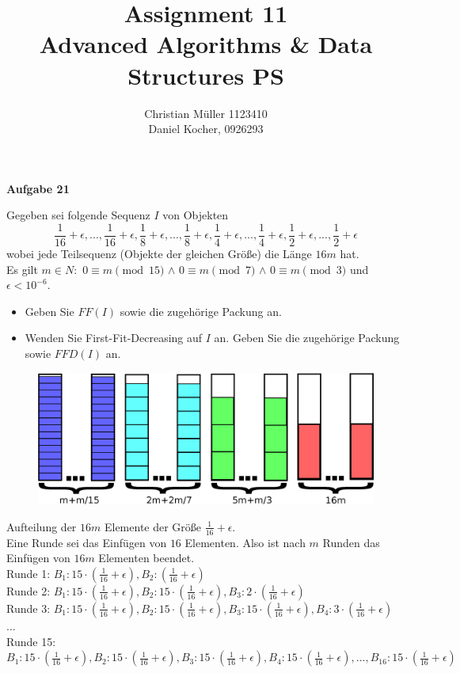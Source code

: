 \documentclass{article}
\begin{document}
\title{Assignment 11 \\ Advanced Algorithms \& Data Structures PS}%
\author{Christian Müller 1123410 \\ Daniel Kocher, 0926293}%
\maketitle

{\bfseries Aufgabe 21}%

Gegeben sei folgende Sequenz $I$ von Objekten
\begin{equation}
\frac{1}{16}+\epsilon,...,\frac{1}{16}+\epsilon,\frac{1}{8}+\epsilon,...,\frac{1}{8}+\epsilon,\frac{1}{4}+\epsilon,...,\frac{1}{4}+\epsilon,\frac{1}{2}+\epsilon,...,\frac{1}{2}+\epsilon
\end{equation}
wobei jede Teilsequenz (Objekte der gleichen Größe) die Länge $16m $ hat.\\ Es gilt $m\in N: $ $0 \equiv m \pmod{15}$ $\wedge$ $0 \equiv m \pmod{7}$ $\wedge$ $0 \equiv m \pmod{3}$ und $\epsilon < 10^{-6}$.
\begin{itemize}
	\item Geben Sie $FF(I)$ sowie die zugehörige Packung an.
	\item Wenden Sie First-Fit-Decreasing auf $I$ an. Geben Sie die zugehörige Packung sowie $FFD(I)$ an.
\end{itemize}

\begin{figure}[H]
\begin{center}
	\includegraphics[scale=.5]{drawing}
\end{center}
\end{figure}
Aufteilung der $16m$ Elemente der Größe  $\frac{1}{16}+\epsilon$. \\
Eine Runde sei das Einfügen von $16$ Elementen. Also ist nach $m$ Runden das Einfügen von $16m$ Elementen beendet.\\

Runde 1: $B_{1}: 15\cdot(\frac{1}{16}+\epsilon), B_{2}:(\frac{1}{16}+\epsilon) $\\
Runde 2: $B_{1}: 15\cdot(\frac{1}{16}+\epsilon), B_{2}:15\cdot(\frac{1}{16}+\epsilon), B_{3}: 2\cdot(\frac{1}{16}+\epsilon) $\\
Runde 3: $B_{1}: 15\cdot(\frac{1}{16}+\epsilon), B_{2}:15\cdot(\frac{1}{16}+\epsilon), B_{3}: 15\cdot(\frac{1}{16}+\epsilon),B_{4}: 3\cdot(\frac{1}{16}+\epsilon)  $\\
...\\
Runde 15: $B_{1}: 15\cdot(\frac{1}{16}+\epsilon), B_{2}:15\cdot(\frac{1}{16}+\epsilon), B_{3}: 15\cdot(\frac{1}{16}+\epsilon),B_{4}: 15\cdot(\frac{1}{16}+\epsilon), ...,B_{16}: 15\cdot(\frac{1}{16}+\epsilon) $
\end{document}
